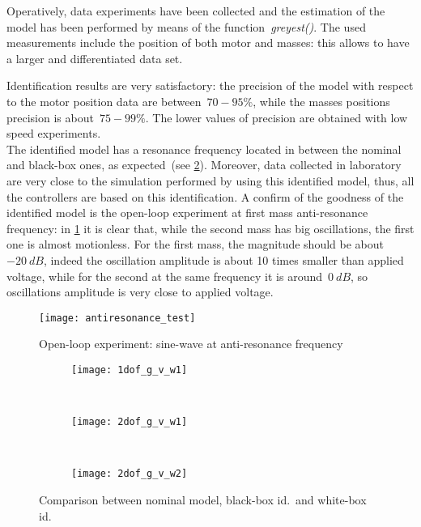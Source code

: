 Operatively, data experiments have been collected and the estimation of the model has been performed by means of the function~\textit{greyest()}. The used measurements include the position of both motor and masses: this allows to have a larger and differentiated data set.

Identification results are very satisfactory: the precision of the model with respect to the motor position data are between~$70 - 95\%$, while the masses positions precision is about~$75 - 99\%$. The lower values of precision are obtained with low speed experiments. \\

The identified model has a resonance frequency located in between the nominal and black-box ones, as expected~(see \cref{fig:allModels_comparison}). Moreover, data collected in laboratory are very close to the simulation performed by using this identified model, thus, all the controllers are based on this identification. A confirm of the goodness of the identified model is the open-loop experiment at first mass anti-resonance frequency: in \cref{fig:antiresonance} it is clear that, while the second mass has big oscillations, the first one is almost motionless. For the first mass, the magnitude should be about~$-20\ dB$, indeed the oscillation amplitude is about 10 times smaller than applied voltage, while for the second at the same frequency it is around~$0\ dB$, so oscillations amplitude is very close to applied voltage.
\begin{figure}[h]
	\centering
	\texttt{[image: antiresonance\_test]}
	\caption{Open-loop experiment: sine-wave at anti-resonance frequency}
	\label{fig:antiresonance}
\end{figure}

\begin{figure}[b]
	\centering
	\begin{subfigure}{\columnwidth}
		\centering
		\texttt{[image: 1dof\_g\_v\_w1]}
	\end{subfigure}
	\\
	\begin{subfigure}{\columnwidth}
		\centering
		\texttt{[image: 2dof\_g\_v\_w1]}
	\end{subfigure}
	\\
	\begin{subfigure}{\columnwidth}
		\centering
		\texttt{[image: 2dof\_g\_v\_w2]}
	\end{subfigure}
	\caption{Comparison between nominal model, black-box id.\ and white-box id.}
	\label{fig:allModels_comparison}
\end{figure}
